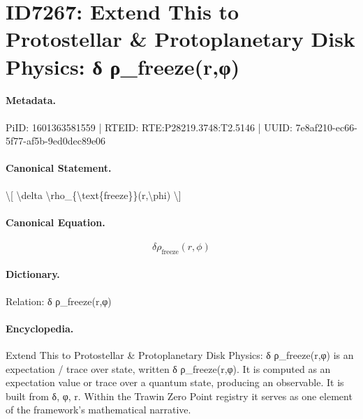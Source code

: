 \section*{ID7267: Extend This to Protostellar \& Protoplanetary Disk Physics: δ ρ\_freeze(r,φ)}
\paragraph{Metadata.}
PiID: 1601363581559 | RTEID: RTE:P28219.3748:T2.5146 | UUID: 7e8af210-ec66-5f77-af5b-9ed0dec89e06

\paragraph{Canonical Statement.}
\textbackslash{}[ \textbackslash{}delta \textbackslash{}rho\_\{\textbackslash{}text\{freeze\}\}(r,\textbackslash{}phi) \textbackslash{}]

\paragraph{Canonical Equation.}
\[
\delta \rho_{\text{freeze}}(r,\phi)
\]

\paragraph{Dictionary.}
Relation: δ ρ\_freeze(r,φ)

\paragraph{Encyclopedia.}
Extend This to Protostellar \& Protoplanetary Disk Physics: δ ρ\_freeze(r,φ) is an expectation / trace over state, written δ ρ\_freeze(r,φ). It is computed as an expectation value or trace over a quantum state, producing an observable. It is built from δ, φ, r. Within the Trawin Zero Point registry it serves as one element of the framework's mathematical narrative.
